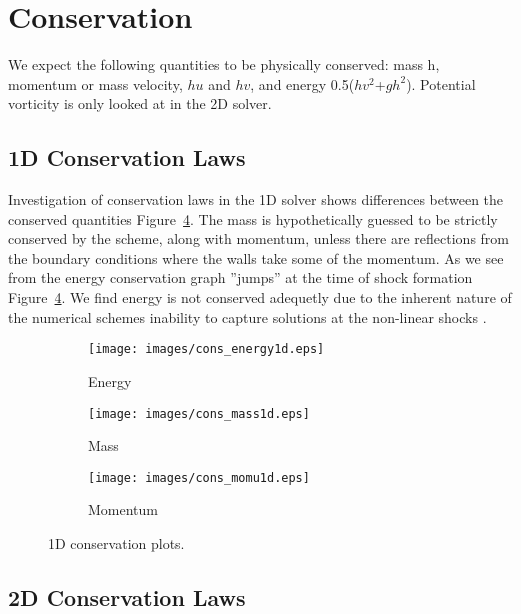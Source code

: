 \section{Conservation}

We expect the following quantities to be physically conserved: mass h, momentum or mass velocity, $hu$ and $hv$, and
energy 0.5($hv^2$+$gh^2$). Potential vorticity is only looked at in the 2D solver. 

\subsection{1D Conservation Laws}
Investigation of conservation laws in the 1D solver shows differences
between the conserved quantities Figure~\ref{fig:1D_cons}. The mass is hypothetically guessed to be strictly conserved by the scheme, along with 
momentum, unless there are reflections from the boundary conditions where the walls take some of the momentum. As we see from the energy conservation 
graph ''jumps'' at the time of shock formation Figure~\ref{fig:1D_cons}. We find energy is not conserved 
adequetly due to the inherent nature of the numerical schemes inability to capture solutions at the non-linear shocks \cite{Lax}. 
\newline

\begin{figure}[h!]
    \centering
    \begin{subfigure}[b]{0.9\textwidth}
        \centering
        \texttt{[image: images/cons\_energy1d.eps]}\hfill
        \caption{Energy}
        \label{fig:Energy}
    \end{subfigure}
    \hfill
    \begin{subfigure}[b]{0.9\textwidth}
        \centering
        \texttt{[image: images/cons\_mass1d.eps]}\hfill
        \caption{Mass}
        \label{fig:Mass}
    \end{subfigure}
    \hfill
    \begin{subfigure}[b]{0.9\textwidth}
        \centering
        \texttt{[image: images/cons\_momu1d.eps]}\hfill
        \caption{Momentum}
        \label{Momentum}
    \end{subfigure}
    \caption{1D conservation plots.}
    \label{fig:1D_cons}
\end{figure}

\subsection{2D Conservation Laws}

